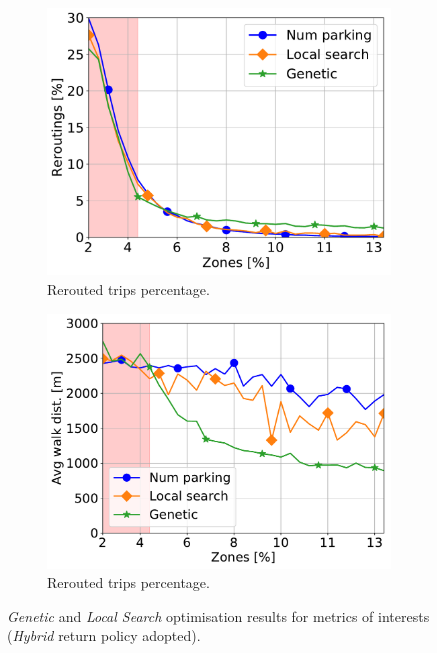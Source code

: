 \begin{figure}[t!]
\begin{center}
		\begin{subfigure}{0.49\textwidth}
			\includegraphics[width=\columnwidth]{figures/Hybrid_ReroutePerc.pdf}
			\caption{Rerouted trips percentage.}
			\label{fig:7_7a_reroute}
		\end{subfigure}
		\begin{subfigure}{0.49\textwidth}
			\includegraphics[width=\columnwidth]{figures/Hybrid_AvgWalkedDistance.pdf}
			\caption{Rerouted trips percentage.}
			\label{fig:7_7a_awd}
		\end{subfigure}         
    \caption{\textit{Genetic} and \textit{Local Search} optimisation results for metrics of interests (\textit{Hybrid} return policy adopted). }
	\label{fig:7_7a_hybrid_optimization}
	\end{center}
\end{figure}

